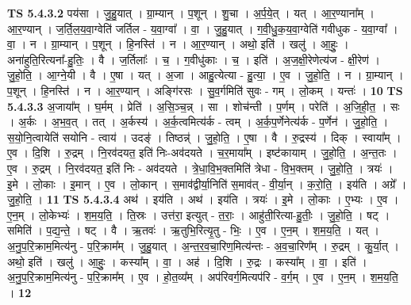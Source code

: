 \documentclass[17pt]{extarticle}
\begin{document}
                  \newline
                                \textbf{ TS 5.4.3.2} \newline
                  पय॑सा । जु॒हु॒यात् । ग्रा॒म्यान् । प॒शून् । शु॒चा । अ॒र्प॒ये॒त् । यत् । आ॒र॒ण्याना᳚म् । आ॒र॒ण्यान् । ज॒र्ति॒ल॒य॒वा॒ग्वेति॑ जर्तिल - य॒वा॒ग्वा᳚ । वा॒ । जु॒हु॒यात् । ग॒वी॒धु॒क॒य॒वा॒ग्वेति॑ गवीधुक - य॒वा॒ग्वा᳚ । वा॒ । न । ग्रा॒म्यान् । प॒शून् । हि॒नस्ति॑ । न । आ॒र॒ण्यान् । अथो॒ इति॑ । खलु॑ । आ॒हुः॒ । अना॑हुति॒रित्यना᳚-हु॒तिः॒ । वै । ज॒र्तिलाः᳚ । च॒ । ग॒वीधु॑काः । च॒ । इति॑ । अ॒ज॒क्षी॒रेणेत्य॑ज - क्षी॒रेण॑ । जु॒हो॒ति॒ । आ॒ग्ने॒यी । वै । ए॒षा । यत् । अ॒जा । आहु॒त्येत्या - हु॒त्या॒ । ए॒व । जु॒हो॒ति॒ । न । ग्रा॒म्यान् । प॒शून् । हि॒नस्ति॑ । न । आ॒र॒ण्यान् । अङ्गि॑रसः । सु॒व॒र्गमिति॑ सुवः - गम् । लो॒कम् । यन्तः॑ । \textbf{  10} \newline
                  \newline
                                \textbf{ TS 5.4.3.3} \newline
                  अ॒जाया᳚म् । घ॒र्मम् । प्रेति॑ । अ॒सि॒ञ्च॒न्न् । सा । शोच॑न्ती । प॒र्णम् । परेति॑ । अ॒जि॒ही॒त॒ । सः । अ॒र्कः । अ॒भ॒व॒त् । तत् । अ॒र्कस्य॑ । अ॒र्क॒त्वमित्य॑र्क - त्वम् । अ॒र्क॒प॒र्णेनेत्य॑र्क - प॒र्णेन॑ । जु॒हो॒ति॒ । स॒यो॒नि॒त्वायेति॑ सयोनि - त्वाय॑ । उदङ्॑ । तिष्ठन्न्॑ । जु॒हो॒ति॒ । ए॒षा । वै । रु॒द्रस्य॑ । दिक् । स्वाया᳚म् । ए॒व । दि॒शि । रु॒द्रम् । नि॒रव॑दयत॒ इति॑ निः-अव॑दयते । च॒र॒माया᳚म् । इष्ट॑कायाम् । जु॒हो॒ति॒ । अ॒न्त॒तः । ए॒व । रु॒द्रम् । नि॒रव॑दयत॒ इति॑ निः - अव॑दयते । त्रे॒धा॒वि॒भ॒क्तमिति॑ त्रेधा - वि॒भ॒क्तम् । जु॒हो॒ति॒ । त्रयः॑ । इ॒मे । लो॒काः । इ॒मान् । ए॒व । लो॒कान् । स॒माव॑द्वीर्या॒निति॑ स॒माव॑त् - वी॒र्या॒न् । क॒रो॒ति॒ । इय॑ति । अग्रे᳚ । जु॒हो॒ति॒ । \textbf{  11} \newline
                  \newline
                                \textbf{ TS 5.4.3.4} \newline
                  अथ॑ । इय॑ति । अथ॑ । इय॑ति । त्रयः॑ । इ॒मे । लो॒काः । ए॒भ्यः । ए॒व । ए॒न॒म् । लो॒केभ्यः॑ । श॒म॒य॒ति॒ । ति॒स्रः । उत्त॑रा॒ इत्युत् - त॒राः॒ । आहु॑ती॒रित्या-हु॒तीः॒ । जु॒हो॒ति॒ । षट् । समिति॑ । प॒द्य॒न्ते॒ । षट् । वै । ऋ॒तवः॑ । ऋ॒तुभि॒रित्यृ॒तु - भिः॒ । ए॒व । ए॒न॒म् । श॒म॒य॒ति॒ । यत् । अ॒नु॒प॒रि॒क्राम॒मित्य॑नु - प॒रि॒क्राम᳚म् । जु॒हु॒यात् । अ॒न्त॒र॒व॒चा॒रिण॒मित्य॑न्तः - अ॒व॒चा॒रिण᳚म् । रु॒द्रम् । कु॒र्या॒त् । अथो॒ इति॑ । खलु॑ । आ॒हुः॒ । कस्या᳚म् । वा॒ । अह॑ । दि॒शि । रु॒द्रः । कस्या᳚म् । वा॒ । इति॑ । अ॒नु॒प॒रि॒क्राम॒मित्य॑नु - प॒रि॒क्राम᳚म् । ए॒व । हो॒त॒व्य᳚म् । अप॑रिवर्ग॒मित्यप॑रि - व॒र्ग॒म् । ए॒व । ए॒न॒म् । श॒म॒य॒ति॒ । \textbf{  12} \newline
\end{document}
